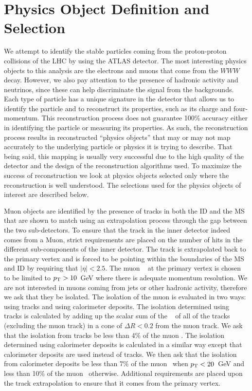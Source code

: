 \section{Physics Object Definition and Selection}
\label{sec:object_selection}
We attempt to identify the stable particles coming from
the proton-proton collisions of the LHC by using the ATLAS detector.
The most interesting physics objects
to this analysis are the electrons and muons
that come from the $WWW$ decay. However, we also pay attention to 
the presence of hadronic activity and neutrinos, since these can
help discriminate the signal from the backgrounds.
Each type of particle has a unique signature in the detector
that allows us to identify the particle and to reconstruct 
its properties, such as its charge and four-momentum. 
This reconstruction process does not guarantee
100\% accuracy either in identifying the particle or measuring its 
properties. As such, the reconstruction process results in reconstructed
``physics objects'' that may or may not map accurately 
to the underlying particle or physics it is trying to describe. That 
being said, this mapping is usually very successful due to the high quality
of the detector and the design of the reconstruction algorithms used.
To maximize the success of reconstruction we look at physics
objects selected only where the reconstruction is well understood.
The selections used for the physics objects of interest are described below.


Muon objects are identified by the presence of tracks in both 
the ID and the MS that are shown 
to match using an extrapolation process through the gap between the
two sub-detectors. To ensure that the track in the inner detector
indeed comes from a Muon, strict requirements are placed
on the number of hits in the different sub-components of the inner detector.
The track is extrapolated back to the primary vertex and is forced
to be pointing within the boundaries of the MS and ID
by requiring that $|\eta|<2.5$.
The muon \pt~ at the primary vertex is chosen to be limited to $p_{\mathrm{T}} > 10$~GeV
where there is adequate momentum resolution. We are not interested in 
muons coming from jets or other hadronic activity, therefore we
ask that they be isolated. The isolation of the muon is evaluated
in two ways: using tracks and using calorimeter deposits.
The isolation determined using tracks is calculated by adding
up the scalar sum of the \pt~ of all of the tracks (excluding
the muon track) in a cone of $\Delta R< 0.2$ from the muon track.
We ask that the isolation from tracks be less than 4\% of the muon \pt.
The isolation determined using calorimeter deposits is calculated in
a similar way except that calorimeter deposits are used instead of tracks.
We then ask that the isolation from calorimeter deposits 
be less than 7\% of the muon \pt~when $p_{\mathrm{T}} < 20$~GeV and 
less than 10\% of the muon \pt~otherwise. Additional requirements
are placed upon the track extrapolation to ensure that it comes from
the primary vertex.


